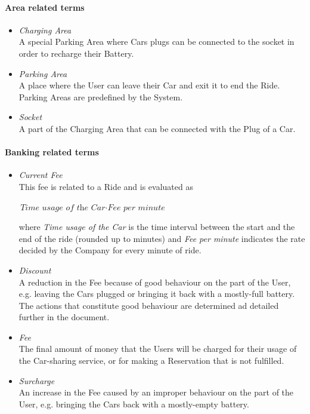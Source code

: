 \paragraph{Area related terms}
	\begin{itemize}
		\item \emph{Charging Area} \\		
		A special Parking Area where Cars plugs can be connected to the socket in order to recharge their Battery.	
	
		\item \emph{Parking Area}\\
		A place where the User can leave their Car and exit it to end the Ride. Parking Areas are predefined by the System.
	
		\item \emph{Socket}\\
		A part of the Charging Area that can be connected with the Plug of a Car. 
	\end{itemize}

\paragraph{Banking related terms}
	\begin{itemize}
		\item \emph{Current Fee}\\
		This fee is related to a Ride and is evaluated as 
		
		$\textit{Time usage of the Car} \cdot \textit{Fee per minute}$ 
		
		where \textit{Time usage of the Car} is the time interval between the start and the end of the ride (rounded up to minutes) and \textit{Fee per minute} indicates the rate decided by the Company for every minute of ride.
		
		\item \emph{Discount} \\
		A reduction in the Fee because of good behaviour on the part of the User, e.g. leaving the Cars plugged or bringing it back with a mostly-full battery. The actions that constitute good behaviour are determined ad detailed further in the document.
	
		\item \emph{Fee}\\
		The final amount of money that the Users will be charged for their usage of the Car-sharing service, or for making a Reservation that is not fulfilled.
			
		\item \emph{Surcharge}\\
		An increase in the Fee caused by an improper behaviour on the part of the User, e.g. bringing the Cars back with a mostly-empty battery.
	\end{itemize}

